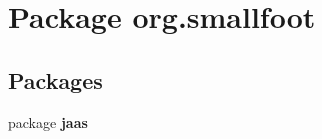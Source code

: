 \section{Package org.\-smallfoot}
\label{namespaceorg_1_1smallfoot}
\subsection*{Packages}
\begin{DoxyCompactItemize}
\item 
package {\bf jaas}
\end{DoxyCompactItemize}
